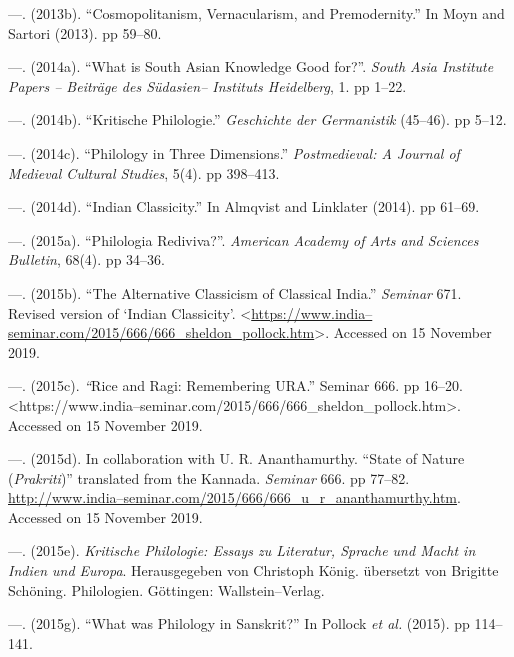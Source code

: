 \begin{thebibliography}{99}
 \item —. (2013b). “Cosmopolitanism, Vernacularism, and Premodernity.” In Moyn and Sartori (2013). pp 59–80.

 \item —. (2014a). “What is South Asian Knowledge Good for?”. \textit{South Asia Institute Papers – Beiträge des Südasien– Instituts Heidelberg}, 1. pp 1–22.

 \item —. (2014b). “Kritische Philologie.” \textit{Geschichte der Germanistik} (45–46). pp 5–12.

 \item —. (2014c). “Philology in Three Dimensions.” \textit{Postmedieval: A Journal of Medieval Cultural Studies}, 5(4). pp 398–413.

 \item —. (2014d). “Indian Classicity.” In Almqvist and Linklater (2014). pp 61–69.

 \item —. (2015a). “Philologia Rediviva?”. \textit{American Academy of Arts and Sciences Bulletin}, 68(4). pp 34–36.

 \item —. (2015b). “The Alternative Classicism of Classical India.” \textit{Seminar} 671. Revised version of ‘Indian Classicity’. \textless \url{https://www.india–seminar.com/2015/666/666_sheldon_pollock.htm}\textgreater . Accessed on 15 November 2019.

 \item —. (2015c).\textit{ “}Rice and Ragi: Remembering URA.” Seminar 666. pp 16–20. \textless https://www.india–seminar.com/2015/666/666\_sheldon\_pollock.htm\textgreater . Accessed on 15 November 2019.

 \item —. (2015d). In collaboration with U. R. Ananthamurthy. “State of Nature (\textit{Prakriti})” translated from the Kannada. \textit{Seminar} 666. pp 77–82. \url{http://www.india–seminar.com/2015/666/666_u_r_ananthamurthy.htm}. Accessed on 15 November 2019.

 \item —. (2015e). \textit{Kritische Philologie: Essays zu Literatur, Sprache und Macht in Indien und Europa}. Herausgegeben von Christoph König. übersetzt von Brigitte Schöning. Philologien. Göttingen: Wallstein–Verlag.

 \item —. (2015g). “What was Philology in Sanskrit?” In Pollock \textit{et al.} (2015). pp 114–141.


\end{thebibliography}
